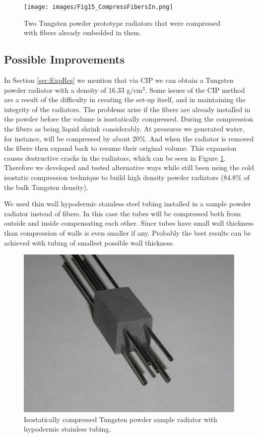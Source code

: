 \begin{figure}[h]
\centering
\texttt{[image: images/Fig15\_CompressFibersIn.png]}
\caption{Two Tungsten powder prototype radiators that were compressed with fibers already embedded in them.}
\label{fig:CompressFibersIn}
\end{figure}

\subsection{Possible Improvements} \label{section:possibleImprovements}

In Section \ref{sec:ExpRes} we mention that via CIP we can obtain a Tungsten powder radiator with a density of 16.33 g/cm$^3$. Some issues of the CIP method are a result of the difficulty in creating the set-up itself, and in maintaining the integrity of the radiators. The problems arise if the fibers are already installed in the powder before the volume is isostatically compressed. During the compression the fibers as being liquid shrink considerably. At pressures we generated water, for instance, will be compressed by about 20\%. And when the radiator is removed the fibers then expand back to resume their original volume. This expansion causes destructive cracks in the radiators, which can be seen in Figure \ref{fig:CompressFibersIn}. Therefore we developed and tested alternative ways while still been using the cold isostatic compression technique to build high density powder radiators (84.8\% of the bulk Tungsten density). 

We used thin wall hypodermic stainless steel tubing installed in a sample powder radiator instead of fibers. In this case the tubes will be compressed both from outside and inside compensating each other. Since tubes have small wall thickness than compression of walls is even smaller if any. Probably the best results can be achieved with tubing of smallest possible wall thickness. 

\begin{figure}[h]
\centering
\includegraphics[width=0.975\linewidth]{images/Pwd_ss_tubes.png}
\caption{Isostatically compressed Tungsten powder sample radiator with hypodermic stainless tubing.}
\label{fig:Isostatic}
\end{figure}

